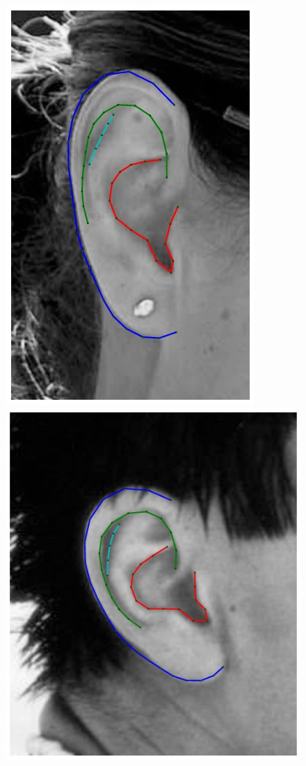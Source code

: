 \begin{figure}[!t]
    \\
    \includegraphics[height=\flowhh]{resources/Ear_Deformable_Model/fittings/final_0012}
    \includegraphics[height=\flowhh]{resources/Ear_Deformable_Model/fittings/final_0022}

\end{figure}
